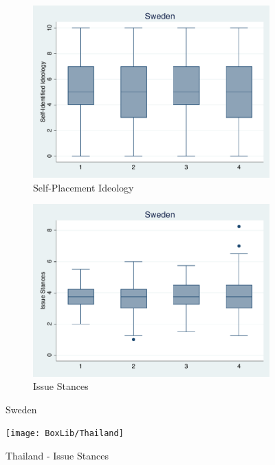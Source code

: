 \documentclass[12pt, titlepage]{article}
\begin{document}
\begin{figure}[H]
	\centering
	\begin{subfigure}[b]{0.475\textwidth}   
		\centering 
		\includegraphics[width=\textwidth]{IdeoBP/Sweden}
		\caption{Self-Placement Ideology}
	\end{subfigure}
	\hfill
	\begin{subfigure}[b]{0.475\textwidth}
		\centering 
		\includegraphics[width=\textwidth]{BoxLib/Sweden}
		\caption{Issue Stances}
	\end{subfigure}
	\caption{Sweden}
	\label{Sweden}
\end{figure}

\begin{figure}[H]
	\centering
	\texttt{[image: BoxLib/Thailand]}
	\caption{Thailand - Issue Stances}
	\label{Thailand}
\end{figure}
\end{document}
